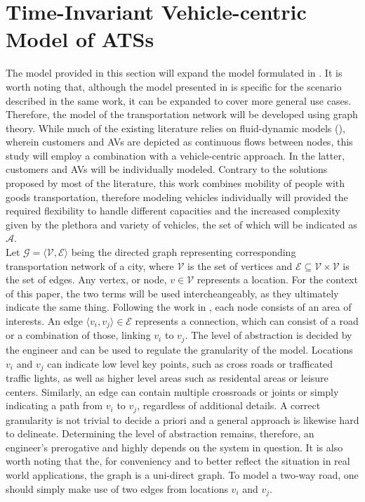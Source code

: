 \section{Time-Invariant Vehicle-centric Model of ATSs}\label{sec:vc_model}
The model provided in this section will expand the model formulated in \cite{project_thesis}. It is worth noting that, although the model presented in \cite{project_thesis} is specific for the scenario described in the same work, it can be expanded to cover more general use cases.
Therefore, the model of the transportation network will be developed using graph theory. While much of the existing literature relies on fluid-dynamic models (\cite{amod_review}), wherein customers and AVs are depicted as continuous flows between nodes, this study will employ a combination with a vehicle-centric approach. In the latter, customers and AVs will be individually modeled. Contrary to the solutions proposed by most of the literature, this work combines mobility of people with goods transportation, therefore modeling vehicles individually will provided the required flexibility to handle different capacities and the increased complexity given by the plethora and variety of vehicles, the set of which will be indicated as $\mathcal{A}$.  \\ 
Let $\mathcal{G} = \langle \mathcal{V}, \mathcal{E} \rangle$ being the directed graph representing corresponding transportation network of a city, where $\mathcal{V}$ is the set of vertices and $\mathcal{E} \subseteq \mathcal{V} \times \mathcal{V}$ is the set of edges. Any vertex, or node,  $ v \in  \mathcal{V}$ represents a location. For the context of this paper, the two terms will be used intercheangeably, as they ultimately indicate the same thing. Following the work in \cite{project_thesis}, each node consists of an area of interests. An edge $\langle v_i, v_j \rangle \in \mathcal{E}$ represents a connection, which can consist of a road or a combination of those, linking $v_i$ to $v_j$. The level of abstraction is decided by the engineer and can be used to regulate the granularity of the model. Locations $v_i$ and $v_j$ can indicate low level key points, such as cross roads or trafficated traffic lights, as well as higher level areas such as residental areas or leisure centers. Similarly, an edge can contain multiple crossroads or joints or simply indicating a path from $v_i$ to $v_j$, regardless of additional details. A correct granularity is not trivial to decide a priori and a general approach is likewise hard to delineate.  Determining the level of abstraction remains, therefore, an engineer's prerogative and highly depends on the system in question. It is also worth noting that the, for conveniency and to better reflect the situation in real world applications, the graph is a uni-direct graph. To model a two-way road, one should simply make use of two edges from locations $v_i$ and $v_j$. \\

